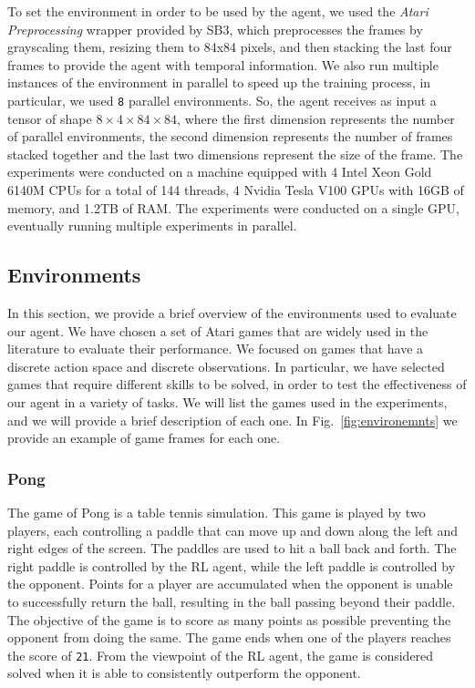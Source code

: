To set the environment in order to be used by the agent, we used the \textit{Atari Preprocessing} wrapper provided by SB3, which preprocesses the frames by grayscaling them, resizing them to 84x84 pixels, and then stacking the last four frames to provide the agent with temporal information.
We also run multiple instances of the environment in parallel to speed up the training process, in particular, we used \texttt{8} parallel environments.
So, the agent receives as input a tensor of shape $8 \times 4 \times 84 \times 84$, where the first dimension represents the number of parallel environments, the second dimension represents the number of frames stacked together and the last two dimensions represent the size of the frame.
The experiments were conducted on a machine equipped with 4 Intel Xeon Gold 6140M CPUs for a total of 144 threads, 4 Nvidia Tesla V100 GPUs with 16GB of memory, and 1.2TB of RAM\@.
The experiments were conducted on a single GPU, eventually running multiple experiments in parallel.


\subsection{Environments}
\label{subsec:environments}
In this section, we provide a brief overview of the environments used to evaluate our agent.
We have chosen a set of Atari games that are widely used in the literature to evaluate their performance.
We focused on games that have a discrete action space and discrete observations.
In particular, we have selected games that require different skills to be solved, in order to test the effectiveness of our agent in a variety of tasks.
We will list the games used in the experiments, and we will provide a brief description of each one.
In Fig.~\ref{fig:environemnts} we provide an example of game frames for each one.
\subsubsection{Pong}
The game of Pong is a table tennis simulation.
This game is played by two players, each controlling a paddle that can move up and down along the left and right edges of the screen.
The paddles are used to hit a ball back and forth.
The right paddle is controlled by the RL agent, while the left paddle is controlled by the opponent.
Points for a player are accumulated when the opponent is unable to successfully return the ball, resulting in the ball passing beyond their paddle.
The objective of the game is to score as many points as possible preventing the opponent from doing the same.
The game ends when one of the players reaches the score of \texttt{21}.
From the viewpoint of the RL agent, the game is considered solved when it is able to consistently outperform the opponent.


